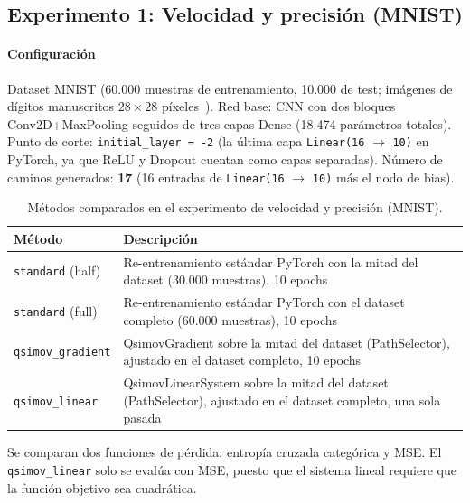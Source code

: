 \subsection{Experimento 1: Velocidad y precisión (MNIST)}

\paragraph{Configuración} Dataset MNIST (60.000 muestras de entrenamiento, 10.000 de test; imágenes
de dígitos manuscritos $28 \times 28$ píxeles~\cite{ref17}). Red base: CNN con dos bloques
Conv2D+MaxPooling seguidos de tres capas Dense (18.474 parámetros totales). Punto de corte:
\texttt{initial\_layer = -2} (la última capa \texttt{Linear(16} $\rightarrow$ \texttt{10)} en PyTorch, ya que
ReLU y Dropout cuentan como capas separadas). Número de caminos generados: \textbf{17} (16 entradas
de \texttt{Linear(16} $\rightarrow$ \texttt{10)} más el nodo de bias).

\begin{table}[htbp]
  \centering
  \caption{Métodos comparados en el experimento de velocidad y precisión (MNIST).}
  \label{tab:metodos_mnist}
  \begin{tabular}{lp{9cm}}
    \toprule
    \textbf{Método} & \textbf{Descripción} \\
    \midrule
    \texttt{standard} (half) & Re-entrenamiento estándar PyTorch con la mitad del dataset (30.000 muestras), 10 epochs \\
    \texttt{standard} (full) & Re-entrenamiento estándar PyTorch con el dataset completo (60.000 muestras), 10 epochs \\
    \texttt{qsimov\_gradient} & QsimovGradient sobre la mitad del dataset (PathSelector), ajustado en el dataset completo, 10 epochs \\
    \texttt{qsimov\_linear}   & QsimovLinearSystem sobre la mitad del dataset (PathSelector), ajustado en el dataset completo, una sola pasada \\
    \bottomrule
  \end{tabular}
\end{table}

Se comparan dos funciones de pérdida: entropía cruzada categórica y MSE. El \texttt{qsimov\_linear}
solo se evalúa con MSE, puesto que el sistema lineal requiere que la función objetivo sea cuadrática.

